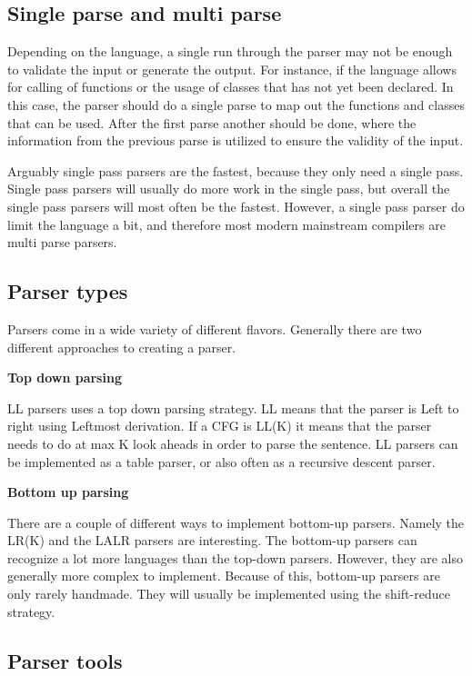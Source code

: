 \subsection{Single parse and multi parse}

Depending on the language, a single run through the parser may not be enough to validate the input or generate the output. 
For instance, if the language allows for calling of functions or the usage of classes that has not yet been declared.
In this case, the parser should do a single parse to map out the functions and classes that can be used. 
After the first parse another should be done, where the information from the previous parse is utilized to ensure the validity of the input. 

Arguably single pass parsers are the fastest, because they only need a single pass. 
Single pass parsers will usually do more work in the single pass, but overall the single pass parsers will most often be the fastest.
However, a single pass parser do limit the language a bit, and therefore most modern mainstream compilers are multi parse parsers.

\subsection{Parser types}

Parsers come in a wide variety of different flavors. 
Generally there are two different approaches to creating a parser.

\textbf{Top down parsing}

LL parsers uses a top down parsing strategy. 
LL means that the parser is Left to right using Leftmost derivation. 
If a CFG is LL(K) it means that the parser needs to do at max K look aheads in order to parse the sentence. 
LL parsers can be implemented as a table parser, or also often as a recursive descent parser. 

\textbf{Bottom up parsing}

There are a couple of different ways to implement bottom-up parsers. 
Namely the LR(K) and the LALR parsers are interesting. 
The bottom-up parsers can recognize a lot more languages than the top-down parsers.
However, they are also generally more complex to implement.
Because of this, bottom-up parsers are only rarely handmade.
They will usually be implemented using the shift-reduce strategy.

\subsection{Parser tools}

